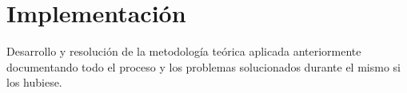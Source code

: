 \chapter{Implementación}
Desarrollo y resolución de la metodología teórica aplicada anteriormente
documentando todo el proceso y los problemas solucionados durante el mismo
si los hubiese.
